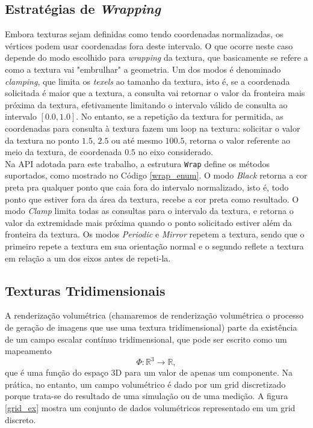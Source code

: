 \documentclass[12pt, a4paper, oneside]{book}
\begin{document}
\subsection{Estratégias de \emph{Wrapping}}
Embora texturas sejam definidas como tendo coordenadas normalizadas, os vértices podem usar coordenadas fora deste intervalo. O que ocorre neste caso depende do modo escolhido para {\it wrapping} da textura, que basicamente se refere a como a textura vai "embrulhar" a geometria. Um dos modos é denominado \emph{clamping}, que limita os {\it texels} ao tamanho da textura, isto é, se a coordenada solicitada é maior que a textura, a consulta vai retornar o valor da fronteira mais próxima da textura, efetivamente limitando o intervalo válido de consulta ao intervalo $[0.0, 1.0]$. No entanto, se a repetição da textura for permitida, as coordenadas para consulta à textura fazem um loop na textura: solicitar o valor da textura no ponto $1.5$, $2.5$ ou até mesmo $100.5$, retorna o valor referente ao meio da textura, de coordenada $0.5$ no eixo considerado. \\

Na API adotada para este trabalho, a estrutura \texttt{Wrap} define os métodos suportados, como mostrado no Código \ref{wrap_enum}. O modo \emph{Black} retorna a cor preta pra qualquer ponto que caia fora do intervalo normalizado, isto é, todo ponto que estiver fora da área da textura, recebe a cor preta como resultado. O modo \emph{Clamp} limita todas as consultas para o intervalo da textura, e retorna o valor da extremidade mais próxima quando o ponto solicitado estiver além da fronteira da textura. Os modos \emph{Periodic} e \emph{Mirror} repetem a textura, sendo que o primeiro repete a textura em sua orientação normal e o segundo reflete a textura em relação a um dos eixos antes de repeti-la.



\subsection{Texturas Tridimensionais}
\label{texturas3d}

A renderização volumétrica (chamaremos de renderização volumétrica o processo de geração de imagens que use uma textura tridimensional) parte da existência de um campo escalar contínuo tridimensional, que pode ser escrito como um mapeamento
\[ \Phi : \mathbb{R}^{3} \rightarrow \mathbb{R},
\]
que é uma função do espaço 3D para um valor de apenas um componente.
Na prática, no entanto, um campo volumétrico é dado por um grid discretizado porque trata-se do resultado de uma simulação ou de uma medição. A figura \ref{grid_ex} mostra um conjunto de dados volumétricos representado em um grid discreto.
\end{document}
